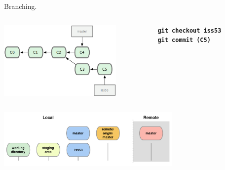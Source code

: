 \documentclass{beamer}
\begin{document}
\begin{frame}{Branching.}
  \begin{columns}
    \begin{column}{0.6\linewidth}
      \begin{center}
        \includegraphics[width=6cm]{figs/18333fig0315-tn}
      \end{center}
    \end{column}
    \begin{column}{0.4\linewidth}
      \begin{center}
        \texttt{\textbf{git checkout iss53}}\\
        \texttt{\textbf{git commit (C5)}}
      \end{center}
    \end{column}
  \end{columns}
  \begin{center}
    \includegraphics[width=9cm]{figs/git-checkout}
  \end{center}
\end{frame}
\end{document}
